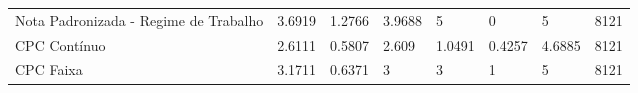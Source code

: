 \begin{table}[H]
{\begin{tabular}{@{}llllllll@{}}
Nota Padronizada - Regime de Trabalho                     & 3.6919         & 1.2766                 & 3.9688           & 5             & 0               & 5               & 8121       \\
CPC Contínuo                                              & 2.6111         & 0.5807                 & 2.609            & 1.0491        & 0.4257          & 4.6885          & 8121       \\
CPC Faixa                                                 & 3.1711         & 0.6371                 & 3                & 3             & 1               & 5               & 8121       \\ \bottomrule
\end{tabular}%
}
\end{table}